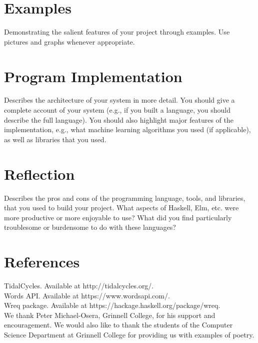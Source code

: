 \documentclass[preprint]{sigplanconf}
\begin{document}
\section{Examples}

Demonstrating the salient features of your project through examples.  Use pictures and graphs whenever appropriate.\\

\section{Program Implementation}

Describes the architecture of your system in more detail.  You should give a complete account of your system (e.g., if you built a language, you should describe the full language).  You should also highlight major features of the implementation, e.g., what machine learning algorithms you used (if applicable), as well as libraries that you used.

\section{Reflection}

Describes the pros and cons of the programming language, tools, and libraries, that you used to build your project.  What aspects of Haskell, Elm, etc. were more productive or more enjoyable to use?  What did you find particularly troublesome or burdensome to do with these languages?\\

\section{References}

TidalCycles. Available at http://tidalcycles.org/. \\

Words API. Available at https://www.wordsapi.com/.\\

Wreq package. Available at https://hackage.haskell.org/package/wreq.\\

\acks
We thank Peter Michael-Osera, Grinnell College, for his support and encouragement. We would also like to thank the students of the Computer Science Department at Grinnell College for providing us with examples of poetry.
\end{document}
